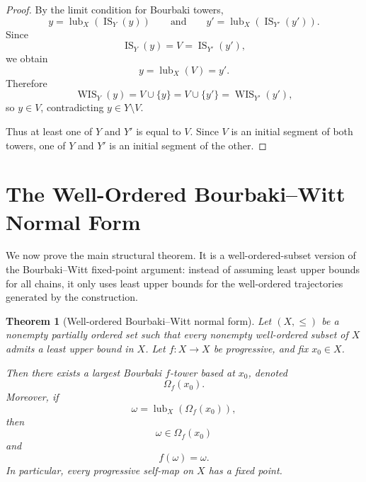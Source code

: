 \documentclass[11pt]{article}
\newtheorem{theorem}{Theorem}[section]
\theoremstyle{definition}
\theoremstyle{remark}
\newcommand{\IS}{\operatorname{IS}}
\newcommand{\WIS}{\operatorname{WIS}}
\newcommand{\lub}{\operatorname{lub}}
\begin{document}
\begin{proof}
By the limit condition for Bourbaki towers,
\[
y=\lub_X(\IS_Y(y))
\qquad\text{and}\qquad
y'=\lub_X(\IS_{Y'}(y')).
\]
Since
\[
\IS_Y(y)=V=\IS_{Y'}(y'),
\]
we obtain
\[
y=\lub_X(V)=y'.
\]
Therefore
\[
\WIS_Y(y)=V\cup\{y\}=V\cup\{y'\}=\WIS_{Y'}(y'),
\]
so \(y\in V\), contradicting \(y\in Y\setminus V\).

Thus at least one of \(Y\) and \(Y'\) is equal to \(V\). Since \(V\) is an initial segment
of both towers, one of \(Y\) and \(Y'\) is an initial segment of the other.
\end{proof}

\section{The Well-Ordered Bourbaki--Witt Normal Form}

We now prove the main structural theorem. It is a well-ordered-subset version of the
Bourbaki--Witt fixed-point argument: instead of assuming least upper bounds for all
chains, it only uses least upper bounds for the well-ordered trajectories generated by the
construction.

\begin{theorem}[Well-ordered Bourbaki--Witt normal form]
Let \((X,\leq)\) be a nonempty partially ordered set such that every nonempty
well-ordered subset of \(X\) admits a least upper bound in \(X\). Let \(f:X\to X\) be
progressive, and fix \(x_0\in X\).

Then there exists a largest Bourbaki \(f\)-tower based at \(x_0\), denoted
\[
\Omega_f(x_0).
\]
Moreover, if
\[
\omega=\lub_X(\Omega_f(x_0)),
\]
then
\[
\omega\in \Omega_f(x_0)
\]
and
\[
f(\omega)=\omega.
\]
In particular, every progressive self-map on \(X\) has a fixed point.
\end{theorem}
\end{document}
